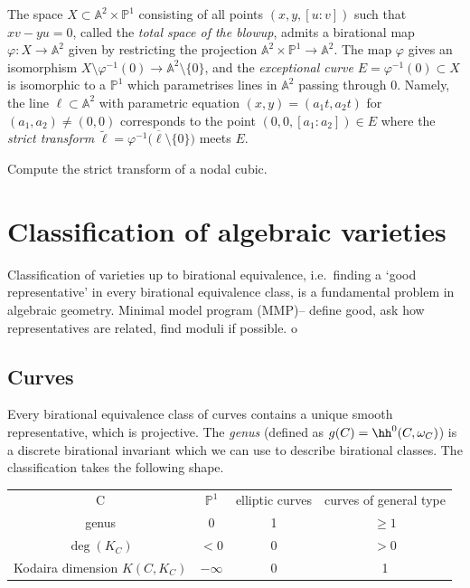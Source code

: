 \begin{example}
The space \(X\subset \mathbb{A}^2\times \mathbb{P}^1\) consisting of all points
\((x,y,[u:v])\) such that \(xv-yu=0\), called the \emph{total space of the
blowup}, admits a birational map \(\varphi:X\to \mathbb{A}^2\) given by
restricting the projection \(\mathbb{A}^2\times\mathbb{P}^1\to \mathbb{A}^2\).
The map \(\varphi\) gives an isomorphism \(X\setminus\varphi^{-1}(0)\to
\mathbb{A}^2\setminus\{0\}\), and the \emph{exceptional curve}
\(E=\varphi^{-1}(0)\subset X\) is isomorphic to a \(\mathbb{P}^1\) which
parametrises lines in \(\mathbb{A}^2\) passing through \(0\). Namely, the line
\(\ell\subset\mathbb{A}^2\) with parametric equation \((x,y)=(a_1t,a_2t)\) for
\((a_1,a_2)\neq (0,0)\) corresponds to the point \((0,0,[a_1:a_2])\in E\) where
the \emph{strict transform} \(\tilde\ell =
\overline{\varphi^{-1}(\ell\setminus\{0\}})\) meets \(E\).

Compute the strict transform of a nodal cubic.
\end{example}

\section{Classification of algebraic varieties}
Classification of varieties up to birational equivalence, i.e.\ finding a `good
representative' in every birational equivalence class, is a fundamental problem
in algebraic geometry. Minimal model program (MMP)-- define good, ask how
representatives are related, find moduli if possible. o

\subsection{Curves} Every birational equivalence class of curves contains a
unique smooth representative, which is projective. The \emph{genus} (defined as
\(g(C)=\hh^0(C,\omega_C)\)) is a discrete birational invariant which we can use
to describe birational classes. The classification takes the following shape.

\begin{tabular}{|cccc|}
    C & \(\mathbb{P}^1\)  & elliptic curves & curves of general type \\
    genus & 0 & 1 & \(\geq 1\) \\
    \(\deg(K_C)\)  & \(<0\) & 0 & \(>0\) \\
    Kodaira dimension \(K(C,K_C)\) & \(-\infty\) & 0 & 1
\end{tabular}

